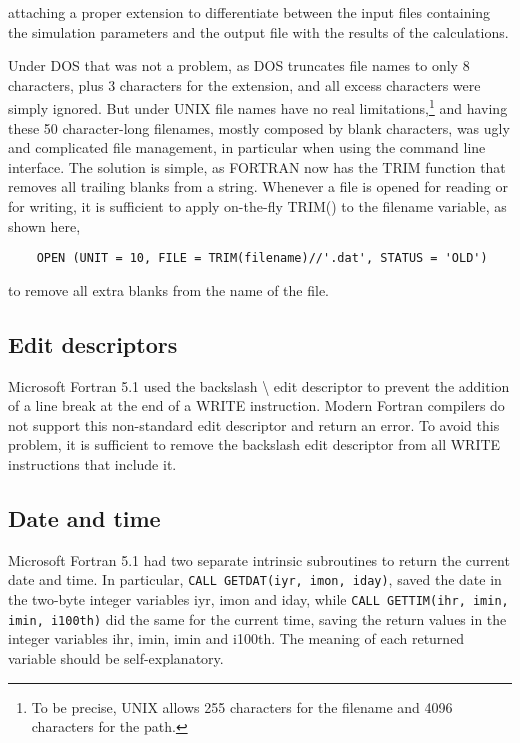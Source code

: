 attaching a proper extension to differentiate between the input files containing the simulation parameters and the output file with the results of the calculations.

Under DOS that was not a problem, as DOS truncates file names to only 8 characters, plus 3 characters for the extension, and all excess characters were simply ignored. But under UNIX file names have no real limitations,\footnote{To be precise, UNIX allows 255 characters for the filename and 4096 characters for the path.} and having these 50 character-long filenames, mostly composed by blank characters, was ugly and complicated file management, in particular when using the command line interface.
The solution is simple, as FORTRAN now has the \textsf{TRIM} function that removes all trailing blanks from a string. Whenever a file is opened for reading or for writing, it is sufficient to apply on-the-fly \textsf{TRIM()} to the \textsf{filename} variable, as shown here,

\begin{lstlisting}
	OPEN (UNIT = 10, FILE = TRIM(filename)//'.dat', STATUS = 'OLD')
\end{lstlisting}

to remove all extra blanks from the name of the file.



\subsection{Edit descriptors}

Microsoft Fortran 5.1 used the backslash \textbackslash{} edit descriptor to prevent the addition of a line break at the end of a \textsf{WRITE} instruction.
Modern Fortran compilers do not support this non-standard edit descriptor and return an error. To avoid this problem, it is sufficient to remove the backslash edit descriptor from all \textsf{WRITE} instructions that include it.


\subsection{Date and time}

Microsoft Fortran 5.1 had two separate intrinsic subroutines to return the current date and time.
In particular, \lstinline[columns=fixed]{CALL GETDAT(iyr, imon, iday)}, saved the date in the two-byte integer variables \textsf{iyr}, \textsf{imon} and \textsf{iday}, while \lstinline[columns=fixed]{CALL GETTIM(ihr, imin, imin, i100th)} did the same for the current time, saving the return values in the integer variables \textsf{ihr}, \textsf{imin}, \textsf{imin} and \textsf{i100th}. The meaning of each returned variable should be self-explanatory.

